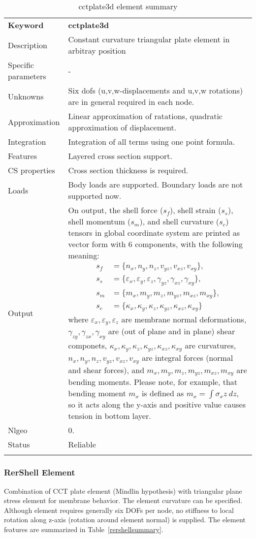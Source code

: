 \documentclass[a4paper]{article}
\newcommand{\param}[1]{\texttt{#1}} %
\newcommand{\templabel}{}%
\newcommand{\tempcaption}{}%
\newcounter{nelpar}
\newenvironment{elementsummary}[5]{%
  \gdef\tempcaption{#4}%
  \gdef\templabel{#5}%
  \setcounter{nelpar}{0}%
  \begin{center} %
    \begin{table}[!htb] %
      \begin{tabular}{|l|p{9cm}|}\hline %
        {\bf Keyword} & \bf{#1}\\ %
        {Description} & {#2}\\ %
        {Specific parameters} & {#3}\\ \hline %
}{
  \\ \hline %
      \end{tabular}%
      \caption{\tempcaption}%
      \label{\templabel}%
    \end{table}%
  \end{center}%
}
\newcommand{\elementParam}[1]{%
  \ifthenelse{\value{nelpar}>0} %
             {&{#1}}%
             {\setcounter{nelpar}{1}Parameters&{#1}}%
             \\%
}
\newcommand{\elementDescription}[2]{{#1} & {#2}\\ }
\begin{document}
\begin{elementsummary}{cctplate3d}{Constant curvature triangular plate element in arbitray position}{-}{cctplate3d element summary}{cctplate3dsummary}
\elementDescription{Unknowns}{Six dofs (u,v,w-displacements and u,v,w rotations) are in general required in each node.}
\elementDescription{Approximation}{Linear approximation of ratations, quadratic approximation of displacement.}
\elementDescription{Integration}{Integration of all terms using one point formula.}
\elementDescription{Features}{Layered cross section support.}
\elementDescription{CS properties}{Cross section thickness is required.}
\elementDescription{Loads}{Body loads are supported. Boundary loads are not supported now.}
\elementDescription{Output}{On output, the shell force ($s_f$), shell strain ($s_s$), shell momentum ($s_m$), and shell curvature ($s_c$) tensors in global coordinate system are printed as vector form with 6 components, with the following meaning:
\begin{align*}
s_f &=\{n_x, n_y, n_z, v_{yz}, v_{xz}, v_{xy}\},\\
s_s &=\{\varepsilon_x, \varepsilon_y, \varepsilon_z, \gamma_{yz}, \gamma_{xz}, \gamma_{xy}\},\\
s_m &=\{m_x, m_y, m_z, m_{yz}, m_{xz}, m_{xy}\},\\
s_c &=\{\kappa_x, \kappa_y, \kappa_z, \kappa_{yz}, \kappa_{xz}, \kappa_{xy}\}
\end{align*}
where $\varepsilon_x, \varepsilon_y, \varepsilon_z$ are membrane normal deformations, $\gamma_{zy}, \gamma_{zx}, \gamma_{xy}$ are (out of plane and in plane) shear componets, $\kappa_x, \kappa_y, \kappa_z, \kappa_{yz}, \kappa_{xz}, \kappa_{xy}$ are curvatures, $n_x, n_y, n_z, v_{yz}, v_{xz}, v_{xy}$ are integral forces (normal and shear forces), and $m_x, m_y, m_z, m_{yz}, m_{xz}, m_{xy}$ are bending moments. 
Please note, for example, that bending moment $m_x$ is defined as $m_x=\int \sigma_x z\ dz$, so it acts along the y-axis and positive value causes tension in bottom layer.}
\elementDescription{Nlgeo}{0.}
\elementDescription{Status}{Reliable}
\end{elementsummary}


\subsubsection {RerShell Element}
Combination of CCT plate element (Mindlin hypothesis) with triangular plane stress element
for membrane behavior. The element curvature can be specified. 
Although element requires generally six DOFs per node, no stiffness to
local rotation along z-axis (rotation around element normal) is supplied. 
The element features are summarized in Table~\ref{rershellsummary}.
\end{document}
